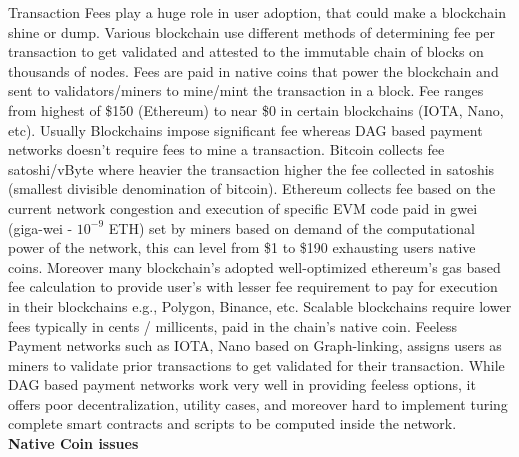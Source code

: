 \documentclass[letterpaper,11pt]{article}
\begin{document}
Transaction Fees play a huge role in user adoption, that could make a blockchain shine or dump. Various blockchain use different methods of determining fee per transaction to get validated and attested to the immutable chain of blocks on thousands of nodes. Fees are paid in native coins that power the blockchain and sent to validators/miners to mine/mint the transaction in a block. Fee ranges from highest of \$150 (Ethereum) to near \$0 in certain blockchains (IOTA, Nano, etc). Usually Blockchains impose significant fee whereas DAG based payment networks doesn't require fees to mine a transaction. Bitcoin collects fee satoshi/vByte where heavier the transaction higher the fee collected in satoshis (smallest divisible denomination of bitcoin). Ethereum collects fee based on the current network congestion and execution of specific EVM code paid in gwei (giga-wei - $10^{-9}$ ETH) set by miners based on demand of the computational power of the network, this can level from \$1 to \$190 exhausting users native coins. Moreover many blockchain's adopted well-optimized ethereum's gas based fee calculation to provide user's with lesser fee requirement to pay for execution in their blockchains e.g., Polygon, Binance, etc. Scalable blockchains require lower fees typically in cents / millicents, paid in the chain's native coin. Feeless Payment networks such as IOTA, Nano based on Graph-linking, assigns users as miners to validate prior transactions to get validated for their transaction. While DAG based payment networks work very well in providing feeless options, it offers poor decentralization, utility cases, and moreover hard to implement turing complete smart contracts and scripts to be computed inside the network.\\

\textbf{Native Coin issues}\\
\end{document}
